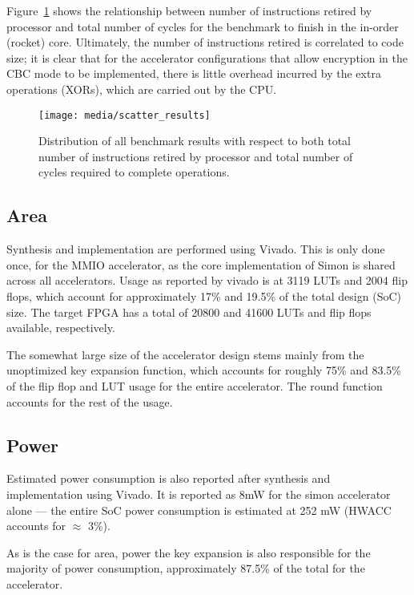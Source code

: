 \documentclass[10pt,conference]{IEEEtran}
\begin{document}

Figure~\ref{fig:scatter} shows the relationship between number of instructions
retired by processor and total number of cycles for the benchmark to finish in
the in-order (rocket) core. Ultimately, the number of instructions retired is
correlated to code size; it is clear that for the accelerator configurations
that allow encryption in the CBC mode to be implemented, there is little
overhead incurred by the extra operations (XORs), which are carried out by
the CPU.


\begin{figure}
  \centering
  \texttt{[image: media/scatter\_results]}
  \caption{Distribution of all benchmark results with respect to both total
    number of instructions retired by processor and total number of cycles
    required to complete operations.}
  \label{fig:scatter}
\end{figure}

\subsection{Area}

Synthesis and implementation are performed using Vivado. This is only done
once, for the MMIO accelerator, as the core implementation of Simon is shared
across all accelerators. Usage as reported by vivado is at 3119 LUTs and 2004
flip flops, which account for approximately 17\% and 19.5\% of the total design
(SoC) size. The target FPGA has a total of 20800 and 41600 LUTs and flip flops
available, respectively.

The somewhat large size of the accelerator design stems mainly from the
unoptimized key expansion function, which accounts for roughly 75\% and 83.5\%
of the flip flop and LUT usage for the entire accelerator. The round function
accounts for the rest of the usage.

\subsection{Power}

Estimated power consumption is also reported after synthesis and implementation
using Vivado. It is reported as 8mW for the simon accelerator alone --- the
entire SoC power consumption is estimated at 252 mW (HWACC accounts for $\approx$ 3\%).

As is the case for area, power the key expansion is also responsible for the
majority of power consumption, approximately 87.5\% of the total for the accelerator.
\end{document}
